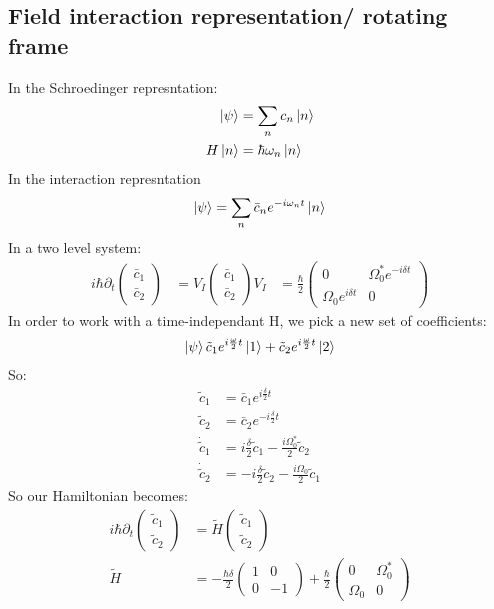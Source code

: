 \subsection{Field interaction representation/ rotating frame}
In the Schroedinger represntation:
\begin{align*}
	\ket{\psi} &= \sum_n c_n \ket{n} \\
	H\ket{n} &= \hbar\omega_n\ket{n}
\end{align*}
In the interaction represntation
\begin{align*}
	\ket{\psi} &= \sum_n \bar{c}_n e^{-i\omega_n t}\ket{n} \\
\end{align*}
In a two level system:
\begin{align*}
	i\hbar\partial_t \begin{pmatrix}
		\bar{c}_1 \\
		\bar{c}_2 
	\end{pmatrix} &= V_I \begin{pmatrix}
	\bar{c}_1 \\
	\bar{c}_2
		      \end{pmatrix}
	V_I &= \frac{\hbar}{2} \begin{pmatrix}
		0 & \Omega_0^* e^{-i\delta t} \\
		\Omega_0 e^{i\delta t} & 0
			\end{pmatrix}
\end{align*}
In order to work with a time-independant H, we pick a new set of coefficients:
\begin{align*}
	\ket{\psi} \tilde{c}_1 e^{i\frac{\omega}{2} t} \ket{1} + \tilde{c}_2 e^{i\frac{\omega}{2} t}\ket{2}
\end{align*}
So:
\begin{align*}
	\tilde{c}_1 &= \bar{c}_1 e^{i\frac{\delta}{2} t} \\
	\tilde{c}_2 &= \bar{c}_2 e^{-i\frac{\delta}{2} t} \\
	\dot{\tilde{c}}_1 &= i\frac{\delta}{2} \tilde{c}_1 -\frac{i\Omega_0^*}{2} \tilde{c}_2 \\
	\dot{\tilde{c}}_2 &= -i\frac{\delta}{2} \tilde{c}_2 -\frac{i\Omega_0}{2} \tilde{c}_1
\end{align*}
So our Hamiltonian becomes:
\begin{align*}
	i\hbar \partial_t \begin{pmatrix}
		\tilde{c}_1 \\
		\tilde{c}_2 
	\end{pmatrix} &= \tilde{H} \begin{pmatrix}
\tilde{c}_1 \\
\tilde{c}_2
			    \end{pmatrix} \\
	\tilde{H} &= -\frac{\hbar\delta}{2} \begin{pmatrix}
		1 & 0 \\
		0 & -1
	\end{pmatrix} + \frac{\hbar}{2} \begin{pmatrix}
		0 & \Omega_0^* \\
		\Omega_0 & 0
				 \end{pmatrix}
\end{align*}
